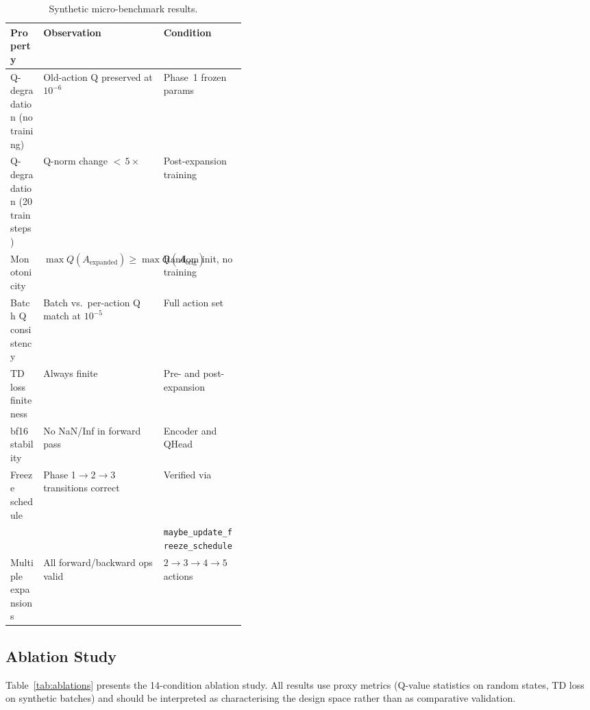 \documentclass{article}
\begin{document}
\begin{table}[h]
  \centering
  \caption{Synthetic micro-benchmark results.}
  \label{tab:benchmarks}
  \begin{tabular}{lp{0.4\linewidth}l}
    \toprule
    \textbf{Property} & \textbf{Observation} & \textbf{Condition} \\
    \midrule
    Q-degradation (no training) & Old-action Q preserved at $10^{-6}$ & Phase~1 frozen params \\
    Q-degradation (20 train steps) & Q-norm change ${<}\,5\times$ & Post-expansion training \\
    Monotonicity & $\max Q(A_\text{expanded}) \geq \max Q(A_\text{orig})$ & Random init, no training \\
    Batch Q consistency & Batch vs.\ per-action Q match at $10^{-5}$ & Full action set \\
    TD loss finiteness & Always finite & Pre- and post-expansion \\
    bf16 stability & No NaN/Inf in forward pass & Encoder and QHead \\
    Freeze schedule & Phase 1$\to$2$\to$3 transitions correct & Verified via \\
    & & \texttt{maybe\_update\_freeze\_schedule} \\
    Multiple expansions & All forward/backward ops valid & $2 \to 3 \to 4 \to 5$ actions \\
    \bottomrule
  \end{tabular}
\end{table}

\subsection{Ablation Study}

Table~\ref{tab:ablations} presents the 14-condition ablation study. All results use proxy metrics (Q-value statistics on random states, TD loss on synthetic batches) and should be interpreted as characterising the design space rather than as comparative validation.
\end{document}

